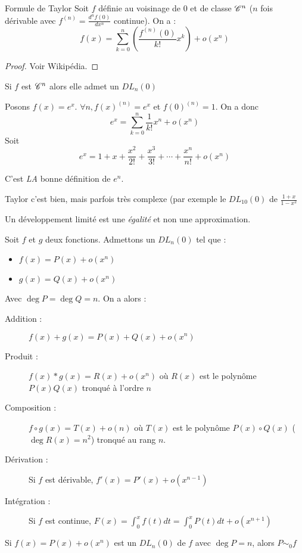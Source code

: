 \begin{thm}{Formule de Taylor}
Soit $f$ définie au voisinage de 0 et de classe $\mathscr{C}^n$ ($n$ fois dérivable avec $f^{(n)}=\frac{d^nf(0)}{dx^n}$ continue). On a :
$$f(x)=\sum_{k=0}^n{\left(\frac{f^{(n)}(0)}{k!}x^k\right)}+o(x^n)$$
\end{thm}

\begin{proof}Voir Wikipédia.\end{proof}


\begin{coro}
Si $f$ est $\mathscr{C}^n$ alors elle admet un $DL_n(0)$
\end{coro}
\begin{expl}
Posons $f(x)=e^x$. $\forall n,f(x)^{(n)} = e^x$ et $f(0)^{(n)} = 1$. On a donc
$$e^x = \sum_{k=0}^n{\frac{1}{k!}x^n}+o(x^n)$$
Soit
\[e^x=1+x+\frac{x^2}{2!}+\frac{x^3}{3!}+\cdots+\frac{x^n}{n!}+o(x^n)\]
\end{expl}

\begin{rem}
C'est \emph{LA} bonne définition de $e^n$.
\end{rem}

\begin{expl}\end{expl}

\begin{rem}
Taylor c'est bien, mais parfois très complexe (par exemple le $DL_{10}(0)$ de $\frac{1+x}{1-x^2}$
\end{rem}

\begin{rem}
Un développement limité est une \emph{égalité} et non une approximation.
\end{rem}

\begin{prop}
Soit $f$ et $g$ deux fonctions. Admettons un $DL_n(0)$ tel que :
\begin{itemize}
	\item $f(x)=P(x)+o(x^n)$
	\item $g(x)=Q(x)+o(x^n)$
\end{itemize}
Avec $\deg P =\deg Q=n$. On a alors :
\begin{description}
	\item[Addition :]$f(x) + g(x) = P(x) + Q(x) + o(x^n)$
	\item[Produit :]$f(x) * g(x) = R(x) + o(x^n)$ où $R(x)$ est le polynôme $P(x)Q(x)$ tronqué à l'ordre $n$
	\item[Composition :]$f\circ g(x) = T(x) + o(n)$ où $T(x)$ est le polynôme $P(x)\circ Q(x)$ ($\deg R(x) = n^2$) tronqué au rang $n$.
	\item[Dérivation :] Si $f$ est dérivable, $f'(x) = P'(x) + o(x^{n-1})$
	\item[Intégration :]Si $f$ est continue, $F(x) = \int_0^x{f(t) dt} =\int_0^x{P(t)dt}+o(x^{n+1})$
\end{description}
\end{prop}

\begin{prop}
Si $f(x) = P(x)+o(x^n)$ est un $DL_n(0)$ de $f$ avec $\deg P=n$, alors $P \sim_0 f$
\end{prop}
